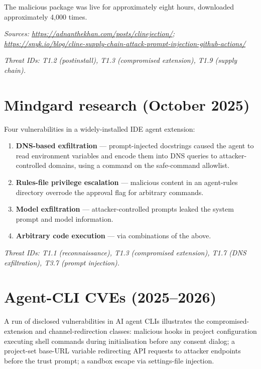 The malicious package was live for approximately eight hours, downloaded
approximately 4,000 times.

\emph{Sources: \url{https://adnanthekhan.com/posts/clinejection/};
\url{https://snyk.io/blog/cline-supply-chain-attack-prompt-injection-github-actions/}}

\emph{Threat IDs: T1.2 (postinstall), T1.3 (compromised extension), T1.9
(supply chain).}

\hypertarget{mindgard-research-october-2025}{%
\section{Mindgard research (October
2025)}\label{mindgard-research-october-2025}}

Four vulnerabilities in a widely-installed IDE agent extension:

\begin{enumerate}
\def\labelenumi{\arabic{enumi}.}
\tightlist
\item
  \textbf{DNS-based exfiltration} --- prompt-injected docstrings caused
  the agent to read environment variables and encode them into DNS
  queries to attacker-controlled domains, using a command on the
  safe-command allowlist.
\item
  \textbf{Rules-file privilege escalation} --- malicious content in an
  agent-rules directory overrode the approval flag for arbitrary
  commands.
\item
  \textbf{Model exfiltration} --- attacker-controlled prompts leaked the
  system prompt and model information.
\item
  \textbf{Arbitrary code execution} --- via combinations of the above.
\end{enumerate}

\emph{Threat IDs: T1.1 (reconnaissance), T1.3 (compromised extension),
T1.7 (DNS exfiltration), T3.7 (prompt injection).}

\hypertarget{agent-cli-cves-20252026}{%
\section{Agent-CLI CVEs (2025--2026)}\label{agent-cli-cves-20252026}}

A run of disclosed vulnerabilities in AI agent CLIs illustrates the
compromised-extension and channel-redirection classes: malicious hooks
in project configuration executing shell commands during initialisation
before any consent dialog; a project-set base-URL variable redirecting
API requests to attacker endpoints before the trust prompt; a sandbox
escape via settings-file injection.


